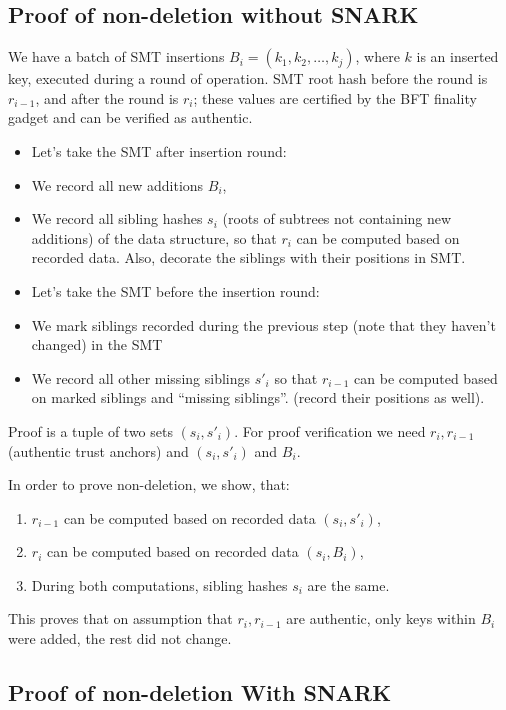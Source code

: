 \documentclass{article}
\begin{document}
\subsection{Proof of non-deletion without SNARK}

We have a batch of SMT insertions $B_i = (k_1, k_2, \dots, k_j)$, where $k$ is an inserted key, executed during a round of operation. SMT root hash before the round is $r_{i-1}$, and after the round is $r_i$; these values are certified by the BFT finality gadget and can be verified as authentic.

\begin{itemize}
        \item Let's take the SMT after insertion round:
        \item We record all new additions $B_i$,
        \item We record all sibling hashes $s_i$ (roots of subtrees not containing new additions) of the data structure, so that $r_i$ can be computed based on recorded data. Also, decorate the siblings with their positions in SMT.
        \item Let's take the SMT before the insertion round:
        \item We mark siblings recorded during the previous step (note that they haven't changed) in the SMT
        \item We record all other missing siblings $s'_i$ so that $r_{i-1}$ can be computed based on marked siblings and ``missing siblings''. (record their positions as well).
\end{itemize}

Proof is a tuple of two sets $(s_i, s'_i)$. For proof verification we need $r_i, r_{i-1}$ (authentic trust anchors) and $(s_i, s'_i)$ and $B_i$.

In order to prove non-deletion, we show, that:
\begin{enumerate}
        \item $r_{i-1}$ can be computed based on recorded data $(s_i, s'_i)$,
        \item $r_i$ can be computed based on recorded data $(s_i, B_i)$,
        \item During both computations, sibling hashes $s_i$  are the same.
\end{enumerate}
This proves that on assumption that $r_i, r_{i-1}$ are authentic, only keys within $B_i$ were added, the rest did not change.


\subsection{Proof of non-deletion With SNARK}
\end{document}
